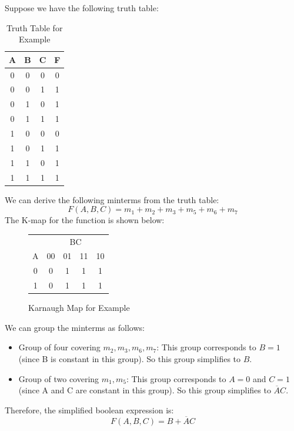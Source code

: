 \documentclass[11pt]{report}
\begin{document}
\begin{example}
    Suppose we have the following truth table:
    \begin{table}[h!]
        \centering
        \begin{tabular}{|c|c|c||c|}
            \hline
            A & B & C & F \\
            \hline
            0 & 0 & 0 & 0 \\
            0 & 0 & 1 & 1 \\
            0 & 1 & 0 & 1 \\
            0 & 1 & 1 & 1 \\
            1 & 0 & 0 & 0 \\
            1 & 0 & 1 & 1 \\
            1 & 1 & 0 & 1 \\
            1 & 1 & 1 & 1 \\
            \hline
        \end{tabular}
        \caption{Truth Table for Example}
        \label{tab:example_truth_table}
    \end{table}
    We can derive the following minterms from the truth table:
    $$
    F(A,B,C) = m_1 + m_2 + m_3 + m_5 + m_6 + m_7
    $$
    The K-map for the function is shown below:
    \begin{figure}[h!]
        \centering
        \begin{tabular}{c|c|c|c|c}
            & \multicolumn{4}{c}{BC} \\
            \cline{2-5}
            A & 00 & 01 & 11 & 10 \\
            \hline
            0 & 0 & 1 & 1 & 1 \\
            1 & 0 & 1 & 1 & 1 \\
        \end{tabular}
        \caption{Karnaugh Map for Example}
        \label{fig:example_karnaugh_map}
    \end{figure}
    We can group the minterms as follows:
    \begin{itemize}
        \item Group of four covering $m_2, m_3, m_6, m_7$: This group corresponds to $B = 1$ (since B is constant in this group). So this group simplifies to $B$.
        \item Group of two covering $m_1, m_5$: This group corresponds to $A = 0$ and $C = 1$ (since A and C are constant in this group). So this group simplifies to $\overline{A}C$.
    \end{itemize}
    Therefore, the simplified boolean expression is:
    $$
    F(A,B,C) = B + \overline{A}C
    $$
\end{example}
\end{document}
